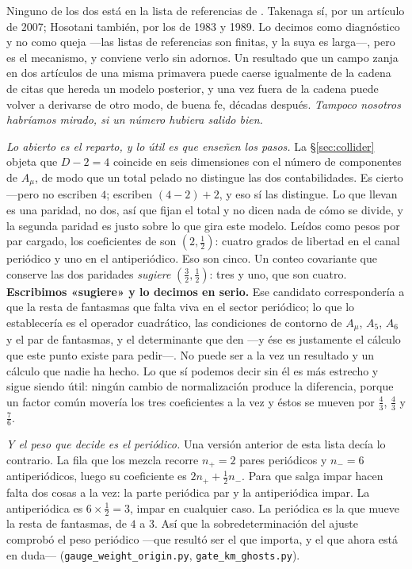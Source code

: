 \documentclass[11pt,a4paper]{article}
\begin{document}
\begin{itemize}
Ninguno de los dos está en la lista de referencias de \cite{KM25}. Takenaga sí, por un artículo de
2007; Hosotani también, por los de 1983 y 1989. Lo decimos como diagnóstico y no como queja ---las
listas de referencias son finitas, y la suya es larga---, pero es el mecanismo, y conviene verlo
sin adornos. Un resultado que un campo zanja en dos artículos de una misma primavera puede caerse
igualmente de la cadena de citas que hereda un modelo posterior, y una vez fuera de la cadena
puede volver a derivarse de otro modo, de buena fe, décadas después. \emph{Tampoco nosotros
habríamos mirado, si un número hubiera salido bien.}

\emph{Lo abierto es el reparto, y lo útil es que enseñen los pasos.} La \S\ref{sec:collider}
objeta que $D-2=4$ coincide en seis dimensiones con el número de componentes de $A_\mu$, de modo
que un total pelado no distingue las dos contabilidades. Es cierto ---pero \cite{HNT} no escriben
$4$; escriben $(4-2)+2$, y eso sí las distingue. Lo que llevan es una paridad, no dos, así que
fijan el total y no dicen nada de cómo se divide, y la segunda paridad es justo sobre lo que gira
este modelo. Leídos
como pesos por par cargado, los coeficientes de \cite{KM25} son $(2,\tfrac12)$: cuatro grados de
libertad en el canal periódico y uno en el antiperiódico. Eso son cinco. Un conteo covariante que
conserve las dos paridades \emph{sugiere} $(\tfrac32,\tfrac12)$: tres y uno, que son cuatro.
\textbf{Escribimos «sugiere» y lo decimos en serio.} Ese candidato correspondería a que la resta de
fantasmas que falta viva en el sector periódico; lo que lo establecería es el operador cuadrático,
las condiciones de contorno de $A_\mu$, $A_5$, $A_6$ y el par de fantasmas, y el determinante que
den ---y ése es justamente el cálculo que este punto existe para pedir---. No puede ser a la vez un
resultado y un cálculo que nadie ha hecho. Lo que sí podemos decir sin él es más estrecho y sigue
siendo útil: ningún cambio de normalización produce la diferencia, porque un factor común movería
los tres coeficientes a la vez y éstos se mueven por $\tfrac43$, $\tfrac43$ y $\tfrac76$.

\emph{Y el peso que decide es el periódico.} Una versión anterior de esta lista decía lo contrario.
La fila que los mezcla recorre $n_+=2$ pares periódicos y $n_-=6$ antiperiódicos, luego su
coeficiente es $2n_++\tfrac12 n_-$. Para que salga impar hacen falta dos cosas a la vez: la parte
periódica par y la antiperiódica impar. La antiperiódica es $6\times\tfrac12=3$, impar en
cualquier caso. La periódica es la que mueve la resta de fantasmas, de $4$ a $3$. Así que la
sobredeterminación del ajuste comprobó el peso periódico ---que resultó ser el que importa, y el
que ahora está en duda--- (\texttt{gauge\_\allowbreak weight\_\allowbreak origin.py},
\texttt{gate\_\allowbreak km\_\allowbreak ghosts.py}).


\end{itemize}
\end{document}
